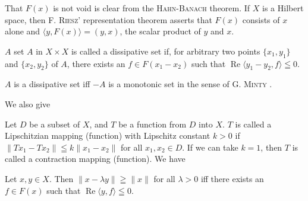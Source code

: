 That $F(x)$ is not void is clear from the \textsc{Hahn}-\textsc{Banach} theorem. If $X$ is a Hilbert space, then F. \textsc{Riesz}' representation theorem asserts that $F(x)$ consists of $x$ alone and $\langle y, F(x) \rangle = (y, x)$, the scalar product of $y$ and $x$. 

\begin{definition}\label{def:XIV.6.Definition.2} $A$ set $A$ in $X \times X$ is called a dissipative set if, for arbitrary two points $\{x_{1}, y_{1}\}$ and $\{x_{2}, y_{2}\}$ of $A$, there exists an $f \in F(x_{1} - x_{2})$ such that $\operatorname{Re}\langle y_{1} - y_{2}, f \rangle \leqq 0$. 
\end{definition}

\begin{remarku} $A$ is a dissipative set iff $-A$ is a monotonic set in the sense of G. \textsc{Minty} \cite{minty203}. 
\end{remarku}

We also give 

\begin{definition}\label{def:XIV.6.Definition.3} Let $D$ be a subset of $X$, and $T$ be a function from $D$ into $X$. $T$ is called a Lipschitzian mapping (function) with Lipschitz constant $k > 0$ if $\|Tx_{1} - Tx_{2}\| \leqq k\|x_{1} - x_{2}\|$ for all $x_{1}, x_{2} \in D$. If we can take $k = 1$, then $T$ is called a contraction mapping (function). We have 
\end{definition}

\begin{lemma}\label{lem:XIV.6.Lemma.1} Let $x, y \in X$. Then $\|x - \lambda y\| \geqq \|x\|$ for all $\lambda > 0$ iff there exists an $f \in F(x)$ such that $\operatorname{Re}\langle y, f \rangle \leqq 0$. 
\end{lemma}

